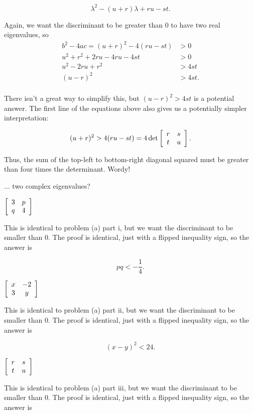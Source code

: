 \documentclass[../key.tex]{subfiles}
\begin{document}
$$\lambda^2 - (u+r)\lambda + ru - st.$$

Again, we want the discriminant to be greater than $0$ to have two real eigenvalues, so
\begin{align*}
b^2-4ac=(u+r)^2 - 4(ru-st)  &> 0 \\
u^2 + r^2 + 2ru - 4ru - 4st &> 0 \\
u^2 - 2ru + r^2 &> 4st \\
(u-r)^2 &> 4st. \\
\end{align*}

There isn't a great way to simplify this, but $(u-r)^2 > 4st$ is a potential answer. The first line of the equations above also gives us a potentially simpler interpretation:

$$(u+r)^2 > 4(ru-st) = 4\det \left[\begin{array}{cc} r & s \\ t & u \end{array}\right].$$

Thus, the sum of the top-left to bottom-right diagonal squared must be greater than four times the determinant. Wordy!

\begin{inner_problem}
\item ... two complex eigenvalues?
\end{inner_problem}

\begin{iinner_problem}[start=1]
\item $\left[\begin{array}{cc} 3 & p \\ q & 4 \end{array}\right]$
\end{iinner_problem}

This is identical to problem (a) part i, but we want the discriminant to be smaller than $0$. The proof is identical, just with a flipped inequality sign, so the answer is

$$pq < -\frac{1}{4}.$$

\begin{iinner_problem}
\item $\left[\begin{array}{cc} x & -2 \\ 3 & y \end{array}\right]$
\end{iinner_problem}

This is identical to problem (a) part ii, but we want the discriminant to be smaller than $0$. The proof is identical, just with a flipped inequality sign, so the answer is

$$(x-y)^2 < 24.$$

\begin{iinner_problem}
\item $\left[\begin{array}{cc} r & s \\ t & u \end{array}\right]$
\end{iinner_problem}

This is identical to problem (a) part iii, but we want the discriminant to be smaller than $0$. The proof is identical, just with a flipped inequality sign, so the answer is
\end{document}
